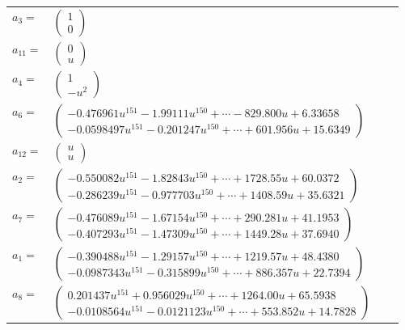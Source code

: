 \documentclass[1p]{elsarticle_modified}
\theoremstyle{definition}
\begin{document}
\begin{tabular}{m{7pt} m{180pt} m{7pt} m{180pt} }
\flushright $a_{3}=$&$\begin{pmatrix}1\\0\end{pmatrix}$ \\
\flushright $a_{11}=$&$\begin{pmatrix}0\\u\end{pmatrix}$ \\
\flushright $a_{4}=$&$\begin{pmatrix}1\\- u^2\end{pmatrix}$ \\
\flushright $a_{6}=$&$\begin{pmatrix}-0.476961 u^{151}-1.99111 u^{150}+\cdots-829.800 u+6.33658\\-0.0598497 u^{151}-0.201247 u^{150}+\cdots+601.956 u+15.6349\end{pmatrix}$ \\
\flushright $a_{12}=$&$\begin{pmatrix}u\\u\end{pmatrix}$ \\
\flushright $a_{2}=$&$\begin{pmatrix}-0.550082 u^{151}-1.82843 u^{150}+\cdots+1728.55 u+60.0372\\-0.286239 u^{151}-0.977703 u^{150}+\cdots+1408.59 u+35.6321\end{pmatrix}$ \\
\flushright $a_{7}=$&$\begin{pmatrix}-0.476089 u^{151}-1.67154 u^{150}+\cdots+290.281 u+41.1953\\-0.407293 u^{151}-1.47309 u^{150}+\cdots+1449.28 u+37.6940\end{pmatrix}$ \\
\flushright $a_{1}=$&$\begin{pmatrix}-0.390488 u^{151}-1.29157 u^{150}+\cdots+1219.57 u+48.4380\\-0.0987343 u^{151}-0.315899 u^{150}+\cdots+886.357 u+22.7394\end{pmatrix}$ \\
\flushright $a_{8}=$&$\begin{pmatrix}0.201437 u^{151}+0.956029 u^{150}+\cdots+1264.00 u+65.5938\\-0.0108564 u^{151}-0.0121123 u^{150}+\cdots+553.852 u+14.7828\end{pmatrix}$ \\

\end{tabular}
\end{document}
